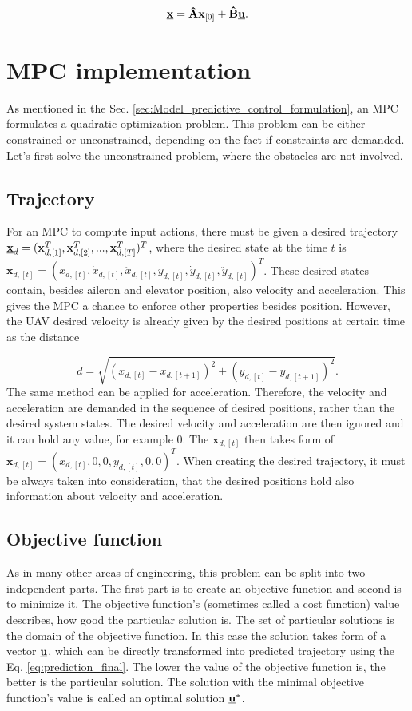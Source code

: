 \documentclass[a4paper,11pt,titlepage]{article}
\newcommand{\uvec}{\textbf{\underline{u}}}
\begin{document}
\begin{equation}
\label{eq:prediction_final}
\textbf{\underline{x}} = \textbf{\^A}\textbf{x}_{[0]} + \textbf{\^B}\uvec.
\end{equation}

\section{MPC implementation}
As mentioned in the Sec. \ref{sec:Model_predictive_control_formulation}, an MPC formulates a quadratic optimization problem. This problem can be either constrained or unconstrained, depending on the fact if constraints are demanded. Let's first solve the unconstrained problem, where the obstacles are not involved. 
\subsection{Trajectory}
For an MPC to compute input actions, there must be given a desired trajectory $\textbf{\underline{x}}_d = 
(\textbf{x}_{d,[1]}^T, \textbf{x}_{d,[2]}^T, ..., \textbf{x}_{d,[T]}^T)^T$, where the desired state at the time $t$ is $\textbf{x}_{d,[t]} = (x_{d,[t]}, \dot{x}_{d,[t]}, \ddot{x}_{d,[t]}, y_{d,[t]}, \dot{y}_{d,[t]}, \ddot{y}_{d,[t]})^T$. These desired states contain, besides aileron and elevator position, also velocity and acceleration. This gives the MPC a chance to  enforce other properties besides position. However, the UAV desired velocity is already given by the desired positions at certain time as the distance 

\begin{equation}
d = \sqrt{(x_{d,[t]}-x_{d,[t+1]})^2+ (y_{d,[t]}- y_{d,[t+1]})^2}.
\end{equation} 
The same method can be applied for acceleration. Therefore, the velocity and acceleration are demanded in the sequence of desired positions, rather than the desired system states. The desired velocity and acceleration are then ignored and it can hold any value, for example 0. The $\textbf{x}_{d,[t]}$ then takes form of $\textbf{x}_{d,[t]} = (x_{d,[t]}, 0, 0, y_{d,[t]}, 0, 0)^T$. When creating the desired trajectory, it must be always taken into consideration, that the desired positions hold also information about velocity and acceleration. 

\subsection{Objective function}
\label{sec:objective_function}
As in many other areas of engineering, this problem can be split into two independent parts. The first part is to create an objective function and second is to minimize it. The objective function's (sometimes called a cost function) value describes, how good the particular solution is. The set of particular solutions is the domain of the objective function. In this case the solution takes form of a vector $\uvec$, which can be directly transformed into predicted trajectory using the Eq. \ref{eq:prediction_final}. The lower the value of the objective function is, the better is the particular solution. The solution with the minimal objective function's value is called an optimal solution $\uvec^*$.
\end{document}
